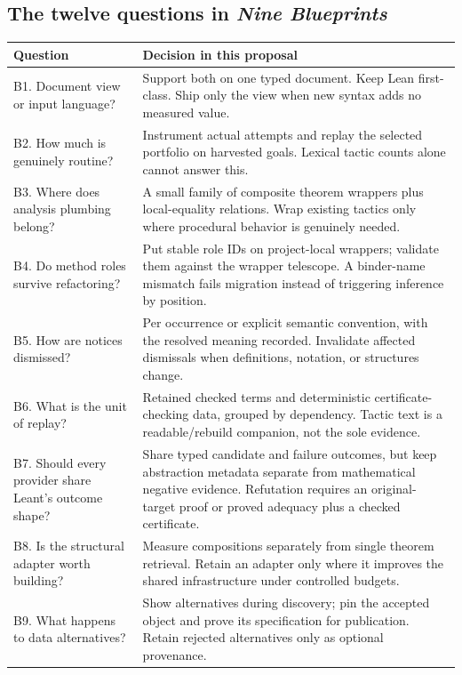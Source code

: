 \documentclass[11pt,a4paper]{article}
\theoremstyle{remark}\newtheorem{example}[proposition]{Example}
\begin{document}
\clearpage
\subsection{The twelve questions in \emph{Nine Blueprints}}
\begingroup\small
\begin{longtable}{@{}P{.34\textwidth}P{.58\textwidth}@{}}
\toprule
Question & Decision in this proposal \\
\midrule\endhead
B1. Document view or input language? & Support both on one typed document. Keep Lean first-class. Ship only the view when new syntax adds no measured value.\\
B2. How much is genuinely routine? & Instrument actual attempts and replay the selected portfolio on harvested goals. Lexical tactic counts alone cannot answer this.\\
B3. Where does analysis plumbing belong? & A small family of composite theorem wrappers plus local-equality relations. Wrap existing tactics only where procedural behavior is genuinely needed.\\
B4. Do method roles survive refactoring? & Put stable role IDs on project-local wrappers; validate them against the wrapper telescope. A binder-name mismatch fails migration instead of triggering inference by position.\\
B5. How are notices dismissed? & Per occurrence or explicit semantic convention, with the resolved meaning recorded. Invalidate affected dismissals when definitions, notation, or structures change.\\
B6. What is the unit of replay? & Retained checked terms and deterministic certificate-checking data, grouped by dependency. Tactic text is a readable/rebuild companion, not the sole evidence.\\
B7. Should every provider share Leant's outcome shape? & Share typed candidate and failure outcomes, but keep abstraction metadata separate from mathematical negative evidence. Refutation requires an original-target proof or proved adequacy plus a checked certificate.\\
B8. Is the structural adapter worth building? & Measure compositions separately from single theorem retrieval. Retain an adapter only where it improves the shared infrastructure under controlled budgets.\\
B9. What happens to data alternatives? & Show alternatives during discovery; pin the accepted object and prove its specification for publication. Retain rejected alternatives only as optional provenance.\\

\end{longtable}
\end{document}
